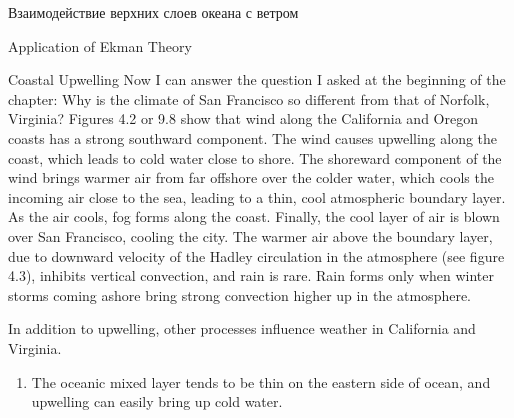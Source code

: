 \begin{chapter}{Взаимодействие верхних слоев океана с ветром}
\begin{section}{Application of Ekman Theory}
\begin{paragraph}{Coastal Upwelling}
Now I can answer the question I asked at the beginning of the chapter:
Why is the climate of San Francisco so different from that of Norfolk,
Virginia?  Figures 4.2 or 9.8 show that wind along the California and
Oregon coasts has a strong southward component. The wind causes
upwelling along the coast, which leads to
cold water close to shore. The shoreward component of the wind brings
warmer air from far offshore over the colder water, which cools the
incoming air close to the sea, leading to a thin, cool atmospheric
boundary layer. As the air cools, fog forms along the coast. Finally,
the cool layer of air is blown over San Francisco, cooling the
city. The warmer air above the boundary layer, due to downward
velocity of the Hadley circulation in the atmosphere (see figure 4.3),
inhibits vertical convection, and rain is rare. Rain forms only when
winter storms coming ashore bring strong convection higher up in the
atmosphere.
%

In addition to upwelling, other processes
influence weather in California and Virginia.
%
%
\begin{enumerate}
\item 
The oceanic mixed layer
tends to be thin on the eastern side of ocean, and upwelling can
easily bring up cold water.
%


\end{enumerate}
\end{paragraph}
\end{section}
\end{chapter}
